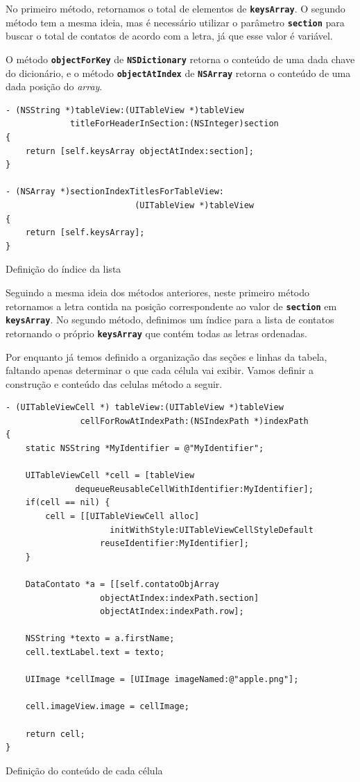 \documentclass[a4paper,12pt,brazil,oneside]{book}
\begin{document}
No primeiro método, retornamos o total de elementos de \texttt{\textbf{keysArray}}. O segundo método tem a mesma ideia, mas é necessário utilizar o parâmetro \texttt{\textbf{section}} para buscar o total de contatos de acordo com a letra, já que esse valor é variável.

O método \texttt{\textbf{objectForKey}} de \texttt{\textbf{NSDictionary}} retorna o conteúdo de uma dada chave do dicionário, e o método \texttt{\textbf{objectAtIndex}} de \texttt{\textbf{NSArray}} retorna o conteúdo de uma dada posição do \emph{array}.

\begin{listing}[H]
\begin{verbatim}
- (NSString *)tableView:(UITableView *)tableView
             titleForHeaderInSection:(NSInteger)section
{
    return [self.keysArray objectAtIndex:section];
}

- (NSArray *)sectionIndexTitlesForTableView:
                          (UITableView *)tableView
{    
    return [self.keysArray];
}
\end{verbatim}
\caption{Definição do índice da lista}
\end{listing}


Seguindo a mesma ideia dos métodos anteriores, neste primeiro método retornamos a letra contida na posição correspondente ao valor de \texttt{\textbf{section}} em \texttt{\textbf{keysArray}}. No segundo método, definimos um índice para a lista de contatos retornando o próprio \texttt{\textbf{keysArray}} que contém todas as letras ordenadas.

Por enquanto já temos definido a organização das seções e linhas da tabela, faltando apenas determinar o que cada célula vai exibir. Vamos definir a construção e conteúdo das celulas método a seguir.

\begin{listing}[H]
\begin{verbatim}
- (UITableViewCell *) tableView:(UITableView *)tableView
               cellForRowAtIndexPath:(NSIndexPath *)indexPath
{
    static NSString *MyIdentifier = @"MyIdentifier";
    
    UITableViewCell *cell = [tableView 
              dequeueReusableCellWithIdentifier:MyIdentifier];
    if(cell == nil) {
        cell = [[UITableViewCell alloc] 
                     initWithStyle:UITableViewCellStyleDefault
                   reuseIdentifier:MyIdentifier];
    }

    DataContato *a = [[self.contatoObjArray
                   objectAtIndex:indexPath.section]
                   objectAtIndex:indexPath.row];

    NSString *texto = a.firstName;
    cell.textLabel.text = texto;
        
    UIImage *cellImage = [UIImage imageNamed:@"apple.png"];
        
    cell.imageView.image = cellImage;
    
    return cell;
}
\end{verbatim}
\caption{Definição do conteúdo de cada célula}
\end{listing}
\end{document}
